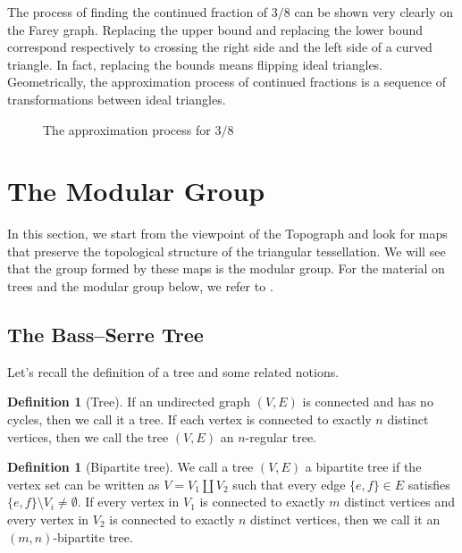 \documentclass[10pt, a4paper]{article}
\theoremstyle{definition}
\newtheorem{definition}[theorem]{Definition}
\theoremstyle{remark}
\begin{document}
The process of finding the continued fraction of \(3/8\) can be shown very clearly on the Farey graph. Replacing the upper bound and replacing the lower bound correspond respectively to crossing the right side and the left side of a curved triangle. In fact, replacing the bounds means flipping ideal triangles. Geometrically, the approximation process of continued fractions is a sequence of transformations between ideal triangles.

\begin{figure}[H]
    \centering
    \caption{The approximation process for \(3/8\)}
\end{figure}


\section{The Modular Group}\label{sec: modular group}

In this section, we start from the viewpoint of the Topograph and look for maps that preserve the topological structure of the triangular tessellation. We will see that the group formed by these maps is the modular group. For the material on trees and the modular group below, we refer to \cite{SerreTrees}.

\subsection{The Bass--Serre Tree}

Let's recall the definition of a tree and some related notions.

\begin{definition}[Tree]
    If an undirected graph \((V,E)\) is connected and has no cycles, then we call it a tree. If each vertex is connected to exactly \(n\) distinct vertices, then we call the tree \((V,E)\) an \(n\)-regular tree.
\end{definition}

\begin{definition}[Bipartite tree]
   We call a tree \((V,E)\) a bipartite tree if the vertex set can be written as \(V= V_1\coprod V_2\) such that every edge \(\{e,f\}\in E\) satisfies \(\{e,f\}\setminus V_i \neq \emptyset.\)
   If every vertex in \(V_1\) is connected to exactly \(m\) distinct vertices and every vertex in \(V_2\) is connected to exactly \(n\) distinct vertices, then we call it an \((m,n)\)-bipartite tree.
\end{definition}
\end{document}
